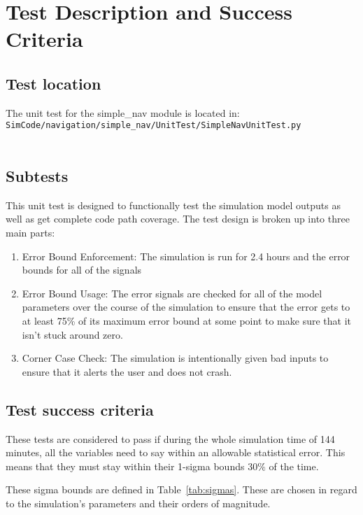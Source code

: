 \section{Test Description and Success Criteria}


\subsection{Test location}

The unit test for the simple\_nav module is located in:\\

\noindent
{\tt SimCode/navigation/simple\_nav/UnitTest/SimpleNavUnitTest.py} \\
\\

\subsection{Subtests}

\noindent This unit test is designed to functionally test the simulation model 
outputs as well as get complete code path coverage.  The test design is broken 
up into three main parts:\\
\begin{enumerate}
\item{Error Bound Enforcement: The simulation is run for 2.4 hours and the 
   error bounds for all of the signals }
\item{Error Bound Usage: The error signals are checked for all of the model 
   parameters over the course of the simulation to ensure that the error gets 
   to at least 75\% of its maximum error bound at some point to make sure that 
   it isn't stuck around zero.}
\item{Corner Case Check: The simulation is intentionally given bad inputs to 
   ensure that it alerts the user and does not crash.}
\end{enumerate}

\subsection{Test success criteria}

These tests are considered to pass if during the whole simulation time of 144 minutes,
all the variables need to say within an allowable statistical error. This means that they
must stay within their 1-sigma bounds $30\%$ of the time.

These sigma bounds are defined in Table~\ref{tab:sigmas}. These are chosen in regard to
the simulation's parameters and their orders of magnitude.

